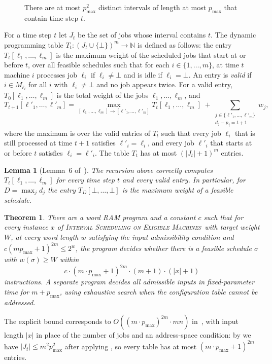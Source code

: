 \documentclass[11pt,a4paper]{article}
\newtheorem{theorem}{Theorem}
\newtheorem{lemma}{Lemma}
\theoremstyle{definition}
\newcommand{\pmax}{p_{\max}}
\newcommand{\ProbEM}{\textsc{Interval Scheduling on Eligible Machines}}
\newcommand{\bigO}{O}
\begin{document}
\begin{figure}[tb]
    \centering
    
    \caption{There are at most $\pmax^2$ distinct intervals of length at most $\pmax$ that
    contain time step $t$.}
    \label{fig:m2p2-interval}
\end{figure}

For a time step $t$ let $J_t$ be the set of jobs whose interval contains $t$. The dynamic
programming table $T_t:(J_t\cup\{\bot\})^m\to\mathbb{N}$ is defined as follows: the entry
$T_t[\ell_1,\ldots,\ell_m]$ is the maximum weight of the scheduled jobs that start at or
before $t$, over all feasible schedules such that for each $i\in\{1,\ldots,m\}$, at time
$t$ machine $i$ processes job $\ell_i$ if $\ell_i\neq\bot$ and is idle if $\ell_i=\bot$. An
entry is \emph{valid} if $i\in M_{\ell_i}$ for all $i$ with $\ell_i\neq\bot$ and no job
appears twice. For a valid entry, $T_0[\ell_1,\ldots,\ell_m]$ is the total weight of the
jobs $\ell_1,\ldots,\ell_m$, and
\[
T_{t+1}[\ell'_1,\ldots,\ell'_m]=\max_{[\ell_1,\ldots,\ell_m]\to[\ell'_1,\ldots,\ell'_m]}
T_t[\ell_1,\ldots,\ell_m]\;+\sum_{\substack{j\in\{\ell'_1,\ldots,\ell'_m\}\\ d_j-p_j=t+1}}w_j,
\]
where the maximum is over the valid entries of $T_t$ such that every job $\ell_i$ that is
still processed at time $t+1$ satisfies $\ell'_i=\ell_i$, and every job $\ell'_i$ that
starts at or before $t$ satisfies $\ell_i=\ell'_i$. The table $T_t$ has at most
$(|J_t|+1)^m$ entries.
\begin{lemma}[Lemma~6 of~\cite{HIMS24}]\label{lem:dpcorrectness2}
The recursion above correctly computes $T_t[\ell_1,\ldots,\ell_m]$ for every time step $t$
and every valid entry. In particular, for $D=\max_j d_j$ the entry
$T_D[\bot,\ldots,\bot]$ is the maximum weight of a feasible schedule.
\end{lemma}

\begin{theorem}\label{thm:fpt}
There are a word RAM program and a constant $c$ such that for every instance $x$ of
\ProbEM\ with target weight $W$, at every word length $w$ satisfying the input
admissibility condition and $c(m\pmax+1)^{2m}\le 2^w$, the program decides whether there is
a feasible schedule $\sigma$ with $w(\sigma)\ge W$ within
\[
c\cdot(m\cdot\pmax+1)^{2m}\cdot(m+1)\cdot(|x|+1)
\]
instructions. A separate program decides all admissible inputs in fixed-parameter time
for $m+\pmax$, using exhaustive search when the configuration table cannot be addressed.
\end{theorem}
The explicit bound corresponds to $\bigO((m\cdot\pmax)^{2m}\cdot mn)$ in~\cite{HIMS24},
with input length $|x|$ in place of the number of jobs and an address-space condition: by  we have $|J_t|\le m^2\pmax^2$ after applying
, so every table has at most $(m\cdot\pmax+1)^{2m}$ entries.
\end{document}
